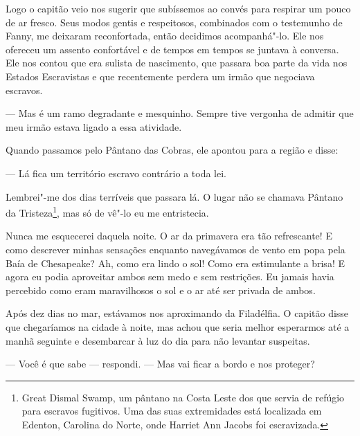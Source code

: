 Logo o capitão veio nos sugerir que
subíssemos ao convés para respirar um pouco de ar fresco. Seus modos
gentis e respeitosos, combinados com o testemunho de Fanny, me deixaram
reconfortada, então decidimos acompanhá"-lo. Ele nos ofereceu um assento
confortável e de tempos em tempos se juntava à conversa. Ele nos contou
que era sulista de nascimento, que passara boa parte da vida nos Estados
Escravistas e que recentemente perdera um irmão que negociava escravos.

--- Mas é um ramo degradante e mesquinho. Sempre tive vergonha de
admitir que meu irmão estava ligado a essa atividade.

Quando passamos pelo Pântano das Cobras, ele apontou para a região e
disse:

--- Lá fica um território escravo contrário a toda lei.

Lembrei"-me dos dias terríveis que passara lá. O lugar não se chamava
Pântano da Tristeza\footnote{Great Dismal Swamp, um pântano na Costa
  Leste dos  que servia de refúgio para escravos fugitivos. Uma das
  suas extremidades está localizada em Edenton, Carolina do Norte, onde
  Harriet Ann Jacobs foi escravizada.}, mas só de vê"-lo eu me
entristecia.

Nunca me esquecerei daquela noite. O ar
da primavera era tão refrescante! E como descrever minhas sensações
enquanto navegávamos de vento em popa pela Baía de Chesapeake? Ah, como
era lindo o sol! Como era estimulante a brisa! E agora eu podia
aproveitar ambos sem medo e sem restrições. Eu jamais havia percebido
como eram maravilhosos o sol e o ar até ser privada de ambos.

Após dez dias no mar, estávamos nos
aproximando da Filadélfia. O capitão disse que chegaríamos na cidade à
noite, mas achou que seria melhor esperarmos até a manhã seguinte e
desembarcar à luz do dia para não levantar suspeitas.

--- Você é que sabe --- respondi. ---
Mas vai ficar a bordo e nos proteger?

